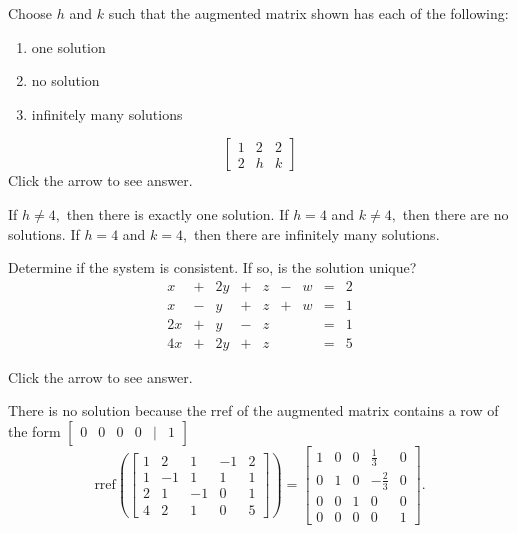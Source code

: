 \documentclass{ximera}
\begin{document}
\begin{problem}\label{prb:2.14}
Choose $h$ and $k$ such that the augmented matrix shown has each of the following:
\begin{enumerate}
\item one solution
\item no solution
\item infinitely many solutions
\end{enumerate}
\begin{equation*}
\left[
\begin{array}{rr|r}
1 & 2 & 2 \\
2 & h & k
\end{array}
\right]
\end{equation*}
Click the arrow to see answer. 
\begin{expandable}{}{}
If $h\neq 4,$ then there is exactly one solution. If $h=4$ and $k\neq 4,$
then there are no solutions. If $h=4$ and $k=4,$ then there are infinitely
many solutions.
\end{expandable}
\end{problem}

\begin{problem}\label{prb:2.15}
Determine if the system is consistent. If so, is the solution unique?
$$\begin{array}{ccccccccc}
      x & +&2y&+&z&-&w&= &2 \\
	 x& -&y&+&z&+&w&=&1\\
     2x& +&y&-&z&&&=&1\\
     4x&+&2y&+&z&&&=&5
    \end{array}$$

Click the arrow to see answer. 
\begin{expandable}{}{}
There is no solution because the rref of the augmented matrix contains a row of the form $\begin{bmatrix}0 & 0 & 0 & 0 & | & 1\end{bmatrix}$ $$\mbox{rref}\left(\left[
\begin{array}{rrrr|r}
1 & 2 & 1 & -1 & 2 \\
1 & -1 & 1 & 1 & 1 \\
2 & 1 & -1 & 0 & 1 \\
4 & 2 & 1 & 0 & 5
\end{array}
\right]\right) = \left[
\begin{array}{rrrr|r}
1 & 0 & 0 &  \frac{1}{3} & 0 \\
0 & 1 & 0 & - \frac{2}{3} & 0 \\
0 & 0 & 1 & 0 & 0 \\
0 & 0 & 0 & 0 & 1
\end{array}
\right] .$$
\end{expandable}
\end{problem}
\end{document}
